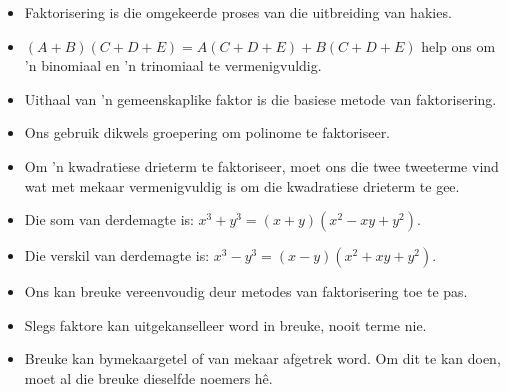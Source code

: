 \begin{itemize}[itemsep=5pt, label=\textbullet{}]
\item Faktorisering is die omgekeerde proses van die uitbreiding van hakies.
\item $(A+B)(C+D+E)=A(C+D+E)+B(C+D+E)$ help ons om ’n binomiaal en ’n trinomiaal te vermenigvuldig.
\item Uithaal van 'n gemeenskaplike faktor is die basiese metode van faktorisering.
\item Ons gebruik dikwels groepering om polinome te faktoriseer.
\item Om ’n kwadratiese drieterm te faktoriseer, moet ons die twee tweeterme vind wat met mekaar vermenigvuldig is om die kwadratiese drieterm te gee.
\item Die som van derdemagte is: ${x}^{3}+{y}^{3}=(x+y)({x}^{2}-xy+{y}^{2})$. 
\item Die verskil van derdemagte is: ${x}^{3}-{y}^{3}=(x-y)({x}^{2}+xy+{y}^{2})$.
\item Ons kan breuke vereenvoudig deur metodes van faktorisering toe te pas.
\item Slegs faktore kan uitgekanselleer word in breuke, nooit terme nie.
\item Breuke kan bymekaargetel of van mekaar afgetrek word. Om dit te kan doen, moet al die breuke dieselfde
noemers hê.

\end{itemize}


